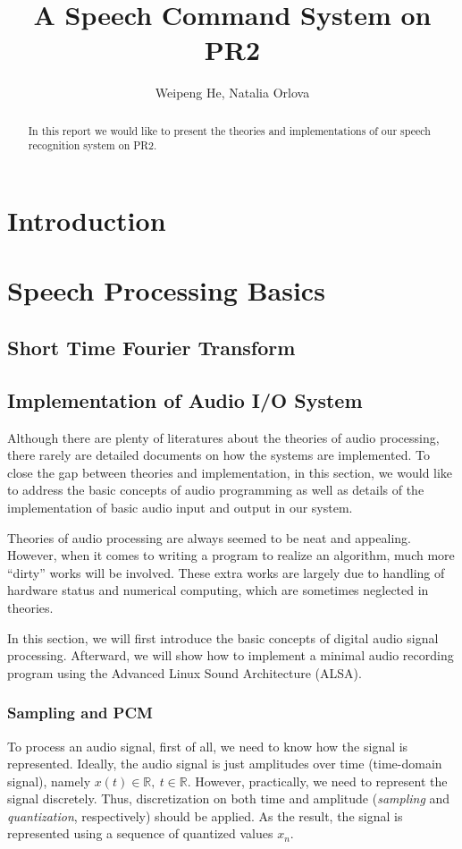 \documentclass[11pt,a4paper]{report}
\begin{document}
\title{A Speech Command System on PR2}
\author{Weipeng He, Natalia Orlova}
\maketitle

\begin{abstract}
  In this report we would like to present the theories and implementations of our speech recognition system on PR2. 
\end{abstract}

\tableofcontents

\listoffigures

\chapter{Introduction}

\chapter{Speech Processing Basics}
\section{Short Time Fourier Transform}

\section{Implementation of Audio I/O System}
Although there are plenty of literatures about the theories of audio processing, there rarely are detailed documents on how the systems are implemented. To close the gap between theories and implementation, in this section, we would like to address the basic concepts of audio programming as well as details of the implementation of basic audio input and output in our system.

Theories of audio processing are always seemed to be neat and appealing. However, when it comes to writing a program to realize an algorithm, much more ``dirty'' works will be involved. These extra works are largely due to handling of hardware status and numerical computing, which are sometimes neglected in theories.

In this section, we will first introduce the basic concepts of digital audio signal processing. Afterward, we will show how to implement a minimal audio recording program using the Advanced Linux Sound Architecture (ALSA).

\subsection{Sampling and PCM}
To process an audio signal, first of all, we need to know how the signal is represented. Ideally, the audio signal is just amplitudes over time (time-domain signal), namely $ x(t) \in \mathbb{R},~ t \in \mathbb{R} $. However, practically, we need to represent the signal discretely. Thus, discretization on both time and amplitude (\textit{sampling} and \textit{quantization}, respectively) should be applied. As the result, the signal is represented using a sequence of quantized values $x_n$.
\end{document}
